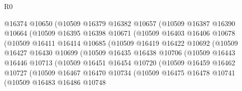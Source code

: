 \begin{lexlean}{R0}
\begin{coremodule}
                        @16374
                        @10650
                        (@10509
                          @16379
                          @16382
                          @10657
                          (@10509
                            @16387
                            @16390
                            @10664
                            (@10509
                              @16395
                              @16398
                              @10671
                              (@10509
                                @16403
                                @16406
                                @10678
                                (@10509
                                  @16411
                                  @16414
                                  @10685
                                  (@10509
                                    @16419
                                    @16422
                                    @10692
                                    (@10509
                                      @16427
                                      @16430
                                      @10699
                                      (@10509
                                        @16435
                                        @16438
                                        @10706
                                        (@10509
                                          @16443
                                          @16446
                                          @10713
                                          (@10509
                                            @16451
                                            @16454
                                            @10720
                                            (@10509
                                              @16459
                                              @16462
                                              @10727
                                              (@10509
                                                @16467
                                                @16470
                                                @10734
                                                (@10509
                                                  @16475
                                                  @16478
                                                  @10741
                                                  (@10509
                                                    @16483
                                                    @16486
                                                    @10748

\end{coremodule}
\end{lexlean}
